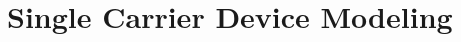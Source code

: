 \documentclass[../thesis.tex]{subfiles}
\begin{document}
\section{Single Carrier Device Modeling}\label{polaron_density_measurement}




\end{document}
